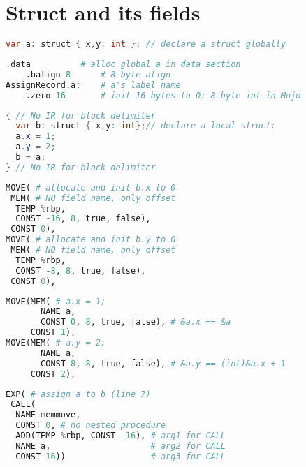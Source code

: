 \section*{Struct and its fields}
\begin{lstlisting}[frame=none,language=Java]
var a: struct { x,y: int }; // declare a struct globally
\end{lstlisting}
\begin{lstlisting}[frame=single, language=Python]
	.data          # alloc global a in data section
	.balign 8      # 8-byte align
AssignRecord.a:    # a's label name
	.zero 16       # init 16 bytes to 0: 8-byte int in Mojo
\end{lstlisting}
\begin{lstlisting}[frame=none,language=Java,morekeywords={struct, var},
numbers=right,firstnumber=2,numbersep=-2pt,numberstyle=\ttfamily\footnotesize]
{ // No IR for block delimiter
  var b: struct { x,y: int};// declare a local struct;
  a.x = 1;
  a.y = 2;
  b = a;
} // No IR for block delimiter
\end{lstlisting}
\begin{lstlisting}[frame=single,language=Python]
MOVE( # allocate and init b.x to 0
 MEM( # NO field name, only offset
  TEMP %rbp,
  CONST -16, 8, true, false),
 CONST 0),
MOVE( # allocate and init b.y to 0
 MEM( # NO field name, only offset
  TEMP %rbp,
  CONST -8, 8, true, false),
 CONST 0),
\end{lstlisting}
\begin{lstlisting}[frame=single, language=Python]
MOVE(MEM( # a.x = 1;
       NAME a,
       CONST 0, 8, true, false), # &a.x == &a
     CONST 1),
MOVE(MEM( # a.y = 2;
       NAME a,
       CONST 8, 8, true, false), # &a.y == (int)&a.x + 1
     CONST 2),
\end{lstlisting}
\begin{lstlisting}[frame=single, language=Python]
EXP( # assign a to b (line 7)
 CALL(
  NAME memmove,
  CONST 0, # no nested procedure
  ADD(TEMP %rbp, CONST -16), # arg1 for CALL
  NAME a,                    # arg2 for CALL
  CONST 16))                 # arg3 for CALL
\end{lstlisting}


